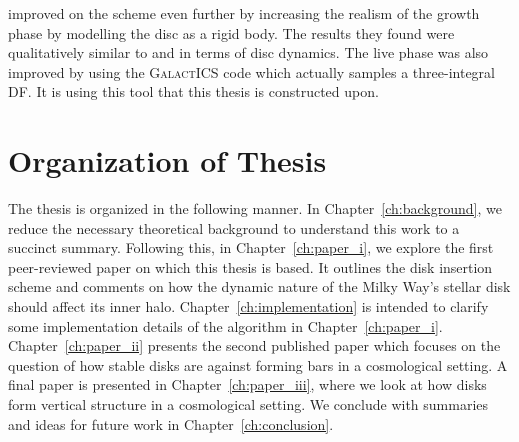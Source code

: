 \citet{bauer2018a} improved on the scheme even further by increasing the realism of the growth phase by modelling the disc as a rigid body. The results they found were qualitatively similar to \citet{debuhr_2012} and \citet{ys_2015}  in terms of disc dynamics. The live phase was also improved by using the \textsc{GalactICS} code which actually samples a three-integral DF. It is using this tool that this thesis is constructed upon.


\section{Organization of Thesis}

The thesis is organized in the following manner. In Chapter~\ref{ch:background}, we reduce the necessary theoretical background to understand this work to a succinct summary. Following this, in Chapter~\ref{ch:paper_i}, we explore the first peer-reviewed paper on which this thesis is based. It outlines the disk insertion scheme and comments on how the dynamic nature of the Milky Way's stellar disk should affect its inner halo. Chapter~\ref{ch:implementation} is intended to clarify some implementation details of the algorithm in Chapter~\ref{ch:paper_i}. Chapter~\ref{ch:paper_ii} presents the second published paper which focuses on the question of how stable disks are against forming bars in a cosmological setting. A final paper is presented in Chapter~\ref{ch:paper_iii}, where we look at how disks form vertical structure in a cosmological setting. We conclude with summaries and ideas for future work in Chapter~\ref{ch:conclusion}.


